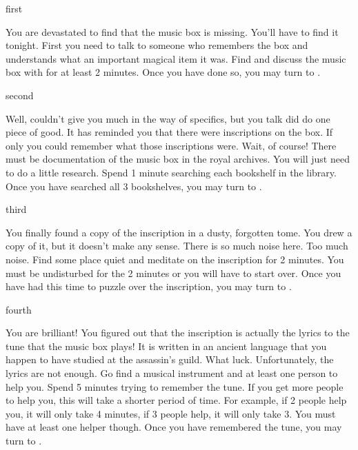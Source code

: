 \documentclass[greennotebook]{NeptuneBall}
\begin{document}

\startnotebook{\nMusicBox{}}

\begin{page}{first}

You are devastated to find that the music box is missing. You'll have to find it tonight. First you need to talk to someone who remembers the box and understands what an important magical item it was. Find \cManta{} and discuss the music box with \cManta{\them} for at least 2 minutes. Once you have done so, you may turn to .

\end{page}

\begin{page}{second}

Well, \cManta{} couldn't give you much in the way of specifics, but you talk did do one piece of good. It has reminded you that there were inscriptions on the box. If only you could remember what those inscriptions were. Wait, of course! There must be documentation of the music box in the royal archives. You will just need to do a little research. Spend 1 minute searching each bookshelf in the library. Once you have searched all 3 bookshelves, you may turn to .

\end{page}

\begin{page}{third}

You finally found a copy of the inscription in a dusty, forgotten tome. You drew a copy of it, but it doesn't make any sense. There is so much noise here. Too much noise. Find some place quiet and meditate on the inscription for 2 minutes. You must be undisturbed for the 2 minutes or you will have to start over. Once you have had this time to puzzle over the inscription, you may turn to .

\end{page}

\begin{page}{fourth}

You are brilliant! You figured out that the inscription is actually the lyrics to the tune that the music box plays! It is written in an ancient language that you happen to have studied at the assassin's guild. What luck. Unfortunately, the lyrics are not enough. Go find a musical instrument and at least one person to help you. Spend 5 minutes trying to remember the tune. If you get more people to help you, this will take a shorter period of time. For example, if 2 people help you, it will only take 4 minutes, if 3 people help, it will only take 3. You must have at least one helper though. Once you have remembered the tune, you may turn to .

\end{page}
\end{document}
